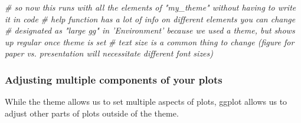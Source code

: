 \documentclass[]{article}
\newenvironment{Shaded}{\begin{snugshade}}{\end{snugshade}}
\newcommand{\CommentTok}[1]{\textcolor[rgb]{0.56,0.35,0.01}{\textit{#1}}}
\begin{document}
\begin{Shaded}
\begin{Highlighting}[]
\CommentTok{# so now this runs with all the elements of "my_theme" without having to write it in code}
\CommentTok{# help function has a lot of info on different elements you can change}
\CommentTok{# designated as "large gg" in 'Environment' because we used a theme, but shows up regular once theme is set}
\CommentTok{# text size is a common thing to change (figure for paper vs. presentation will necessitate different font sizes)}
\end{Highlighting}
\end{Shaded}

\subsubsection{Adjusting multiple components of your
plots}\label{adjusting-multiple-components-of-your-plots}

While the theme allows us to set multiple aspects of plots, ggplot
allows us to adjust other parts of plots outside of the theme.
\end{document}
